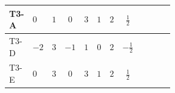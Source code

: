 \documentclass{article}
\begin{document}
\begin{landscape}
\begin{longtable}{@{}llcccccc >{\raggedright\arraybackslash}p{0.54\linewidth}@{}}
\midrule
T3-A & $0$ & $1$ & $0$ & $3$ & $1$ & $2$ & $\frac{1}{2}$ & \scriptsize\adjustbox{max width=\linewidth}{$\begin{gathered} \operatorname{Tr}\!\left({y_2}\,\left({y_2}\right)^{\dagger}\right) \left({y_2}\right)_{ij} \\ +\frac{1}{2} (\left({y_1}\,\left({y_1}\right)^{\dagger}\,{y_2}\right)_{ij}+\left({Y_e}\,\left({Y_e}\right)^{\dagger}\,{y_2}\right)_{ij}+3 \left({y_2}\,\left({y_2}\right)^{\dagger}\,{y_2}\right)_{ij}) \\ -\frac{9}{2} {g_2}^2 \left({y_2}\right)_{ij} \\ -\frac{3}{2} {g_Y}^2 \left({y_2}\right)_{ij}\end{gathered}$} \\
\midrule
T3-D & $-2$ & $3$ & $-1$ & $1$ & $0$ & $2$ & $-\frac{1}{2}$ & \scriptsize\adjustbox{max width=\linewidth}{$\begin{gathered} 2 \operatorname{Tr}\!\left({y_2}\,\left({y_2}\right)^{\dagger}\right) \left({y_2}\right)_{ij} \\ +\frac{3}{4} \left({y_1}\,\left({y_1}\right)^{\dagger}\,{y_2}\right)_{ij} \\ +\frac{1}{2} \left({Y_e}\,\left({Y_e}\right)^{\dagger}\,{y_2}\right)_{ij} \\ +\left({y_2}\,\left({y_2}\right)^{\dagger}\,{y_2}\right)_{ij} \\ -\frac{9}{2} {g_2}^2 \left({y_2}\right)_{ij} \\ -\frac{3}{2} {g_Y}^2 \left({y_2}\right)_{ij}\end{gathered}$} \\
\midrule
T3-E & $0$ & $3$ & $0$ & $3$ & $1$ & $2$ & $\frac{1}{2}$ & \scriptsize\adjustbox{max width=\linewidth}{$\begin{gathered} \operatorname{Tr}\!\left({y_2}\,\left({y_2}\right)^{\dagger}\right) \left({y_2}\right)_{ij} \\ +\frac{1}{4} (3 \left({y_1}\,\left({y_1}\right)^{\dagger}\,{y_2}\right)_{ij}+2 \left({Y_e}\,\left({Y_e}\right)^{\dagger}\,{y_2}\right)_{ij}+6 \left({y_2}\,\left({y_2}\right)^{\dagger}\,{y_2}\right)_{ij}) \\ -\frac{9}{2} {g_2}^2 \left({y_2}\right)_{ij} \\ -\frac{3}{2} {g_Y}^2 \left({y_2}\right)_{ij}\end{gathered}$} \\
\midrule
\bottomrule
\end{longtable}
\clearpage

\end{landscape}
\end{document}
